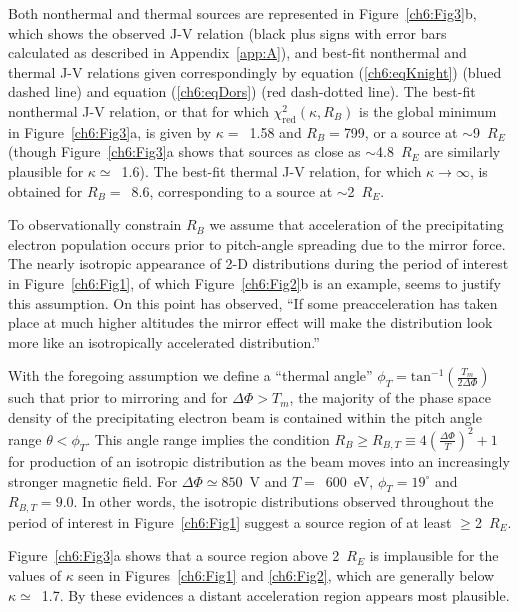   Both nonthermal and thermal sources are represented in
  Figure~\ref{ch6:Fig3}b, which shows the observed J-V relation (black
  plus signs with error bars calculated as described in
  Appendix~\ref{app:A}), and best-fit nonthermal and thermal J-V
  relations given correspondingly by equation (\ref{ch6:eqKnight})
  (blued dashed line) and equation (\ref{ch6:eqDors}) (red dash-dotted
  line). The best-fit nonthermal J-V relation, or that for which
  $\chi^2_{\textrm{red}} ( \kappa, R_B )$ is the global minimum in
  Figure~\ref{ch6:Fig3}a, is given by $\kappa =$~1.58 and $R_B =$799,
  or a source at $\sim$9~$R_E$ (though Figure~\ref{ch6:Fig3}a shows
  that sources as close as $\sim$4.8~$R_E$ are similarly plausible for
  $\kappa \simeq$~1.6). The best-fit thermal J-V relation, for which
  $\kappa \rightarrow \infty$, is obtained for $R_B =$~8.6,
  corresponding to a source at $\sim$2~$R_E$.

  To observationally constrain $R_B$ we assume that acceleration of
  the precipitating electron population occurs prior to pitch-angle
  spreading due to the mirror force. The nearly isotropic appearance
  of 2-D distributions during the period of interest in
  Figure~\ref{ch6:Fig1}, of which Figure~\ref{ch6:Fig2}b is an
  example, seems to justify this assumption. On this point
  \citet{Bostrom2003a} has observed, ``If some preacceleration has
  taken place at much higher altitudes the mirror effect will make the
  distribution look more like an isotropically accelerated
  distribution.''

  With the foregoing assumption we define a ``thermal angle'' $\phi_T
  = \textrm{tan}^{-1} ( \frac{T_m}{2 \Delta \Phi} )$ such that prior
  to mirroring and for $\Delta \Phi > T_m$, the majority of the phase
  space density of the precipitating electron beam is contained within
  the pitch angle range $ \theta < \phi_T$.  This angle range implies
  the condition $R_B \geq R_{B,T} \equiv 4 ( \frac{\Delta \Phi}{T} )^2
  + 1$ for production of an isotropic distribution as the beam moves
  into an increasingly stronger magnetic field. For $\Delta \Phi
  \simeq 850$~V and $T =$~600~eV, $\phi_T = 19^\circ$ and $R_{B,T} =
  9.0$. 
  In other words, the isotropic distributions observed throughout the
  period of interest in Figure~\ref{ch6:Fig1} suggest a source region
  of at least $\geq$2~$R_E$.

  Figure~\ref{ch6:Fig3}a shows that a source region above 2~$R_E$ is
  implausible for the values of $\kappa$ seen in
  Figures~\ref{ch6:Fig1} and \ref{ch6:Fig2}, which are generally below
  $\kappa \simeq$~1.7. By these evidences a distant acceleration
  region appears most plausible.

